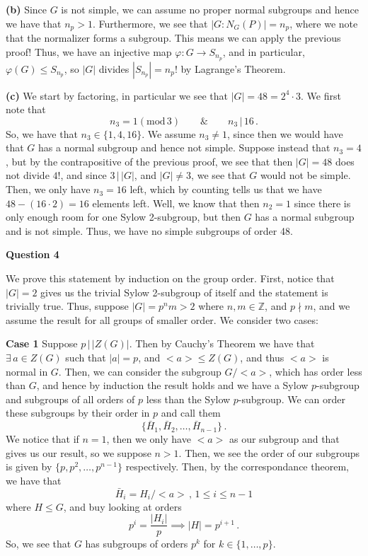\documentclass[10pt]{article}
\newcommand{\Z}{\mathbb{Z}}
\begin{document}
\textbf{(b)} Since $G$ is not simple, we can assume no proper normal subgroups and hence we have that $n_{p} > 1$. Furthermore, we see that $|G:N_{G}(P)| = n_{p}$, where we note that the normalizer forms a subgroup. This means we can apply the previous proof! Thus, we have an injective map $\varphi: G \to S_{n_{p}}$, and in particular, $\varphi(G)\leq S_{n_{p}}$, so $|G|$ divides $|S_{n_{p}}| = n_{p}!$ by Lagrange's Theorem.

\textbf{(c)} We start by factoring, in particular we see that $|G| = 48 = 2^{4}\cdot 3$. We first note that
\[ n_{3} = 1 (\text{mod} \, 3) \hspace{2em} \& \hspace{2em} n_{3} \, |\, 16 \, .\]
So, we have that $n_{3} \in \{1, 4, 16\}$. We assume $n_{3} \neq 1$, since then we would have that $G$ has a normal subgroup and hence not simple. Suppose instead that $n_{3} = 4$, but by the contrapositive of the previous proof, we see that then $|G| = 48$ does not divide $4!$, and since $3\, | \, |G|$, and $|G| \neq 3$, we see that $G$ would not be simple. Then, we only have $n_{3} = 16$ left, which by counting tells us that we have $48 - (16 \cdot 2) = 16$ elements left. Well, we know that then $n_{2} = 1$ since there is only enough room for one Sylow 2-subgroup, but then $G$ has a normal subgroup and is not simple. Thus, we have no simple subgroups of order 48.

\newpage
\textbf{Question 4}

We prove this statement by induction on the group order. First, notice that $|G| = 2$ gives us the trivial Sylow 2-subgroup of itself and the statement is trivially true. Thus, suppose $|G| = p^{n}m > 2$ where $n,m \in \Z$,  and $p \nmid m$, and we assume the result for all groups of smaller order. We consider two cases:

\textbf{Case 1} Suppose $p\, |\, |Z(G)|$. Then by Cauchy's Theorem we have that $\exists \, a \in Z(G)$ such that $|a| = p$, and $<a> \leq Z(G)$, and thus $<a>$ is normal in $G$. Then, we can consider the subgroup $G/<a>$, which has order less than $G$, and hence by induction the result holds and we have a Sylow $p$-subgroup and subgroups of all orders of $p$ less than the Sylow $p$-subgroup. We can order these subgroups by their order in $p$ and call them
\[\{\bar{H}_{1}, \bar{H}_{2}, \dots , \bar{H}_{n-1} \} \,.\]
We notice that if $n = 1$, then we only have $<a>$ as our subgroup and that gives us our result, so we suppose $n>1$. Then, we see the order of our subgroups is given by $\{ p, p^{2}, \dots, p^{n-1}\}$ respectively. Then, by the correspondance theorem, we have that
\[ \bar{H}_{i} = H_{i}/<a> \, , \, 1 \leq i \leq n-1\]
where $H \leq G$, and buy looking at orders
\[ p^{i} = \frac{|H_{i}|}{p} \implies |H| = p^{i+1} \, .\]
So, we see that $G$ has subgroups of orders $p^{k}$ for $k\in \{1, \dots, p\}$.
\end{document}
